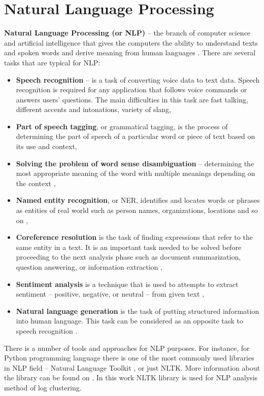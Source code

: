 \documentclass[thesis=M,english]{FITthesis}[2019/12/23]
\begin{document}
\section{Natural Language Processing}
\textbf{Natural Language Processing (or NLP)} -- the branch of computer science and artificial intelligence that gives the computers the ability to understand texts and spoken words and derive meaning from human languages \cite{nlp-definition-tds, nlp-definition-ibm}. There are several tasks that are typical for NLP:
\begin{itemize}
	\item \textbf{Speech recognition} -- is a task of converting voice data to text data. Speech recognition is required for any application that follows voice commands or answers users' questions. The main difficulties in this task are fast talking, different accents and intonations, variety of slang,
	\item \textbf{Part of speech tagging}, or grammatical tagging, is the process of determining the part of speech of a particular word or piece of text based on its use and context,
	\item \textbf{Solving the problem of word sense disambiguation} -- determining the most appropriate meaning of the word with multiple meanings depending on the context \cite{nlp-definition-ibm},
	\item \textbf{Named entity recognition}, or NER, identifies and locates words or phrases as entities of real world such as person names, organizations, locations and so on \cite{ner-wiki},
	\item \textbf{Coreference resolution} is the task of finding expressions that refer to the same entity in a text. It is an important task needed to be solved before proceeding to the next analysis phase such as document summarization, question answering, or information extraction \cite{coreference-stanford},
	\item \textbf{Sentiment analysis} is a technique that is used to attempts to extract sentiment -- positive, negative, or neutral -- from given text \cite{sentiment-analysis-def},
	\item \textbf{Natural language generation} is the task of putting structured information into human language. This task can be considered as an opposite task to speech recognition \cite{nlp-definition-ibm}. 
\end{itemize}

There is a number of tools and approaches for NLP purposes. For instance, for Python programming language there is one of the most commonly used libraries in NLP field -- Natural Language Toolkit , or just NLTK. More information about the library can be found on \cite{nltk-homepage}. In this work NLTK library is used for NLP analysis method of log clustering.
\end{document}
